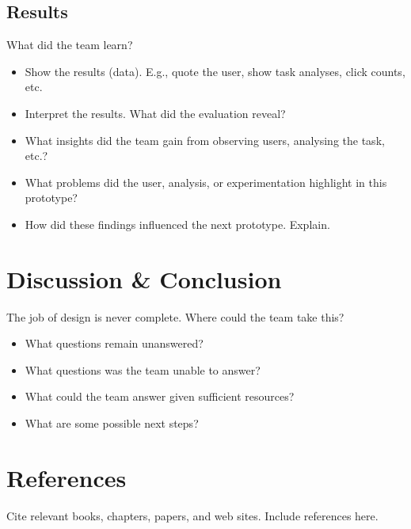 \documentclass[11pt]{article} %
\begin{document}
\subsection{Results}
What did the team learn?
\begin{itemize}
\item Show the results (data). E.g., quote the user, show task analyses, click counts, etc.
\item Interpret the results. What did the evaluation reveal?
\item What insights did the team gain from observing users, analysing the task, etc.?
\item What problems did the user, analysis, or experimentation highlight in this prototype?
\item How did these findings influenced the next prototype. Explain.
\end{itemize}

\section{Discussion \& Conclusion}
The job of design is never complete. Where could the team take this?
\begin{itemize}
\item What questions remain unanswered?
\item What questions was the team unable to answer?
\item What could the team answer given sufficient resources?
\item What are some possible next steps?
\end{itemize}

\section{References}
Cite relevant books, chapters, papers, and web sites.
Include references here.
\end{document}
